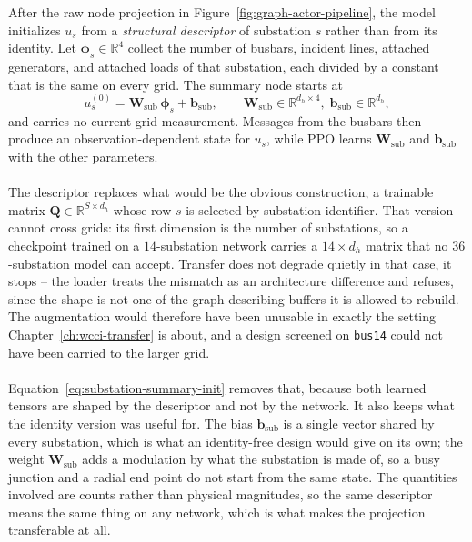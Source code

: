 \noindent After the raw node projection in
Figure~\ref{fig:graph-actor-pipeline}, the model initializes $u_s$ from a
\emph{structural descriptor} of substation $s$ rather than from its identity.
Let $\boldsymbol\phi_s\in\mathbb R^{4}$ collect the number of busbars, incident
lines, attached generators, and attached loads of that substation, each divided
by a constant that is the same on every grid. The summary node starts at
\begin{equation}
  u_s^{(0)} = \mathbf W_{\mathrm{sub}}\,\boldsymbol\phi_s + \mathbf b_{\mathrm{sub}},
  \qquad
  \mathbf W_{\mathrm{sub}}\in\mathbb R^{d_h\times 4},\;
  \mathbf b_{\mathrm{sub}}\in\mathbb R^{d_h},
  \label{eq:substation-summary-init}
\end{equation}
and carries no current grid measurement. Messages from the busbars then produce
an observation-dependent state for $u_s$, while PPO learns
$\mathbf W_{\mathrm{sub}}$ and $\mathbf b_{\mathrm{sub}}$ with the other
parameters.
\\
\\
{\color{clarif}
The descriptor replaces what would be the obvious construction, a trainable
matrix $\mathbf Q\in\mathbb R^{S\times d_h}$ whose row $s$ is selected by
substation identifier. That version cannot cross grids: its first dimension is
the number of substations, so a checkpoint trained on a $14$-substation network
carries a $14\times d_h$ matrix that no $36$-substation model can accept.
Transfer does not degrade quietly in that case, it stops -- the loader treats
the mismatch as an architecture difference and refuses, since the shape is not
one of the graph-describing buffers it is allowed to rebuild. The augmentation
would therefore have been unusable in exactly the setting
Chapter~\ref{ch:wcci-transfer} is about, and a design screened on
\texttt{bus14} could not have been carried to the larger grid.
\\
\\
Equation~\ref{eq:substation-summary-init} removes that, because both learned
tensors are shaped by the descriptor and not by the network. It also keeps what
the identity version was useful for. The bias $\mathbf b_{\mathrm{sub}}$ is a
single vector shared by every substation, which is what an identity-free design
would give on its own; the weight $\mathbf W_{\mathrm{sub}}$ adds a modulation
by what the substation is made of, so a busy junction and a radial end point do
not start from the same state. The quantities involved are counts rather than
physical magnitudes, so the same descriptor means the same thing on any network,
which is what makes the projection transferable at all.
}

